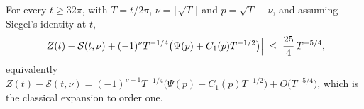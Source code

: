 \begin{corollary}
\label{cor:rsf_formula_sharp}
\leanok
For every $t\ge32\pi$, with $T=t/2\pi$, $\nu=\lfloor\sqrt T\rfloor$ and $p=\sqrt T-\nu$, and
assuming Siegel's identity  at $t$,
\[
  \Bigl\lvert Z(t)-\mathcal S(t,\nu)
    +(-1)^{\nu}T^{-1/4}\bigl(\Psi(p)+C_{1}(p)T^{-1/2}\bigr)\Bigr\rvert
  \;\le\;\frac{25}4\,T^{-5/4},
\]
equivalently $Z(t)-\mathcal S(t,\nu)=(-1)^{\nu-1}T^{-1/4}\bigl(\Psi(p)+C_{1}(p)T^{-1/2}\bigr)
+O\bigl(T^{-5/4}\bigr)$, which is the classical expansion to order one.
\end{corollary}

